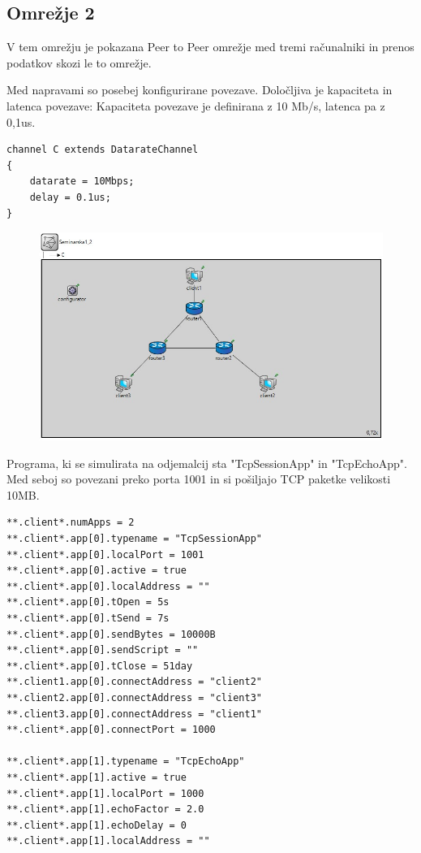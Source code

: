 \documentclass[11pt,a4paper,slovene]{myarticle}
\begin{document}
\pagebreak
\subsection{Omrežje 2}
V tem omrežju je pokazana Peer to Peer omrežje med tremi računalniki in prenos podatkov skozi le to omrežje. 

Med napravami so posebej konfigurirane povezave. Določljiva je kapaciteta in latenca povezave:
Kapaciteta povezave je definirana z 10 Mb/s, latenca pa z 0,1us.

\begin{lstlisting}
channel C extends DatarateChannel
{
    datarate = 10Mbps;
    delay = 0.1us;
}
\end{lstlisting}

\begin{figure}[h]
  \includegraphics[width=\linewidth]{omrezje2.jpg}
\end{figure}

Programa, ki se simulirata na odjemalcij sta "TcpSessionApp" in "TcpEchoApp". Med seboj so povezani preko porta 1001 in si pošiljajo TCP paketke velikosti 10MB.

\begin{lstlisting}
**.client*.numApps = 2
**.client*.app[0].typename = "TcpSessionApp"
**.client*.app[0].localPort = 1001
**.client*.app[0].active = true
**.client*.app[0].localAddress = ""
**.client*.app[0].tOpen = 5s
**.client*.app[0].tSend = 7s
**.client*.app[0].sendBytes = 10000B
**.client*.app[0].sendScript = ""
**.client*.app[0].tClose = 51day
**.client1.app[0].connectAddress = "client2"
**.client2.app[0].connectAddress = "client3"
**.client3.app[0].connectAddress = "client1"
**.client*.app[0].connectPort = 1000

**.client*.app[1].typename = "TcpEchoApp"
**.client*.app[1].active = true
**.client*.app[1].localPort = 1000
**.client*.app[1].echoFactor = 2.0
**.client*.app[1].echoDelay = 0
**.client*.app[1].localAddress = ""
\end{lstlisting}
\end{document}
